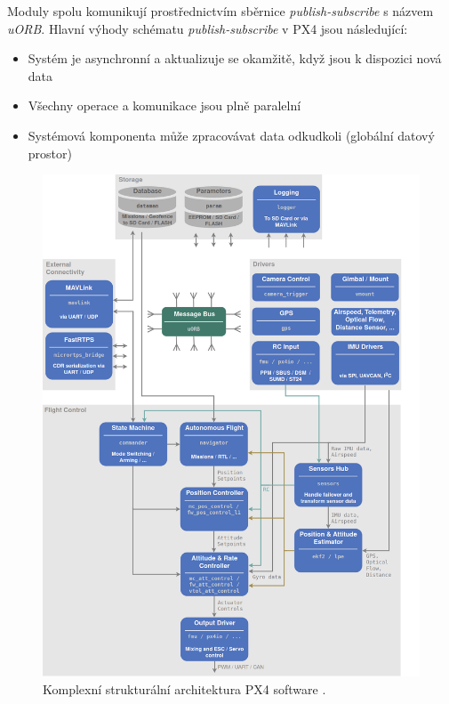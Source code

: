 Moduly spolu komunikují prostřednictvím sběrnice \textit{publish-subscribe} s názvem \textit{uORB}. Hlavní výhody schématu \textit{publish-subscribe} v PX4 jsou následující:

\begin{itemize}
    \item Systém je asynchronní a aktualizuje se okamžitě, když jsou k dispozici nová data
    \item Všechny operace a komunikace jsou plně paralelní
    \item Systémová komponenta může zpracovávat data odkudkoli (globální datový prostor)
\end{itemize}

\begin{figure}[!ht]
    \begin{center}
        \includegraphics[scale=0.44]{obrazky/PX41}
    \end{center}
    \caption[Komplexní strukturální architektura PX4 software]{Komplexní strukturální architektura PX4 software \cite{PX4docs}.}
    \label{fig:PX4_Arch}
\end{figure}


